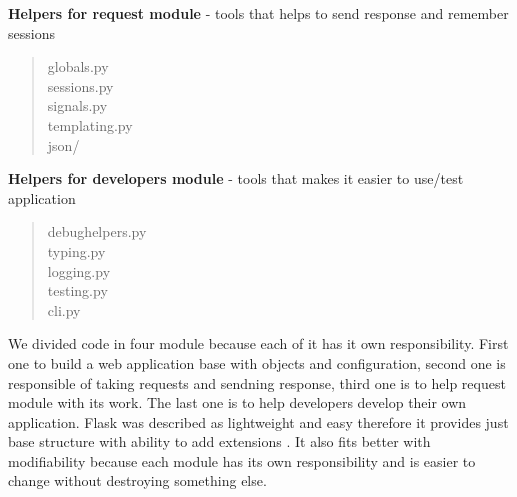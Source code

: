 \documentclass[12pt,a4paper]{article}
\begin{document}
 \textbf{Helpers for request module} - tools that helps to send response and remember sessions \\
 \begin{quote}
     globals.py\\
     sessions.py\\
     signals.py\\
     templating.py\\
     json/
 \end{quote}

 \textbf{Helpers for developers module} - tools that makes it easier to use/test application\\
 \begin{quote}
     debughelpers.py\\
     typing.py\\
     logging.py\\
     testing.py\\
     cli.py
 \end{quote}

We divided code in four module because each of it has it own responsibility. First one to build a web application base with objects and configuration, second one is responsible of taking requests and sendning response, third one is to help request module with its work. The last one is to help developers develop their own application. Flask was described as lightweight and easy therefore it provides just base structure with ability to add extensions \cite{flaskgit}. It also fits better with modifiability because each module has its own responsibility and is easier to change without destroying something else.\\
\\ \\ \\ \\ \\ \\ \\ \\ \\ \\ \\ \\ \\ \\ \\ \\ \\ \\ \\ \\ \\
\end{document}
